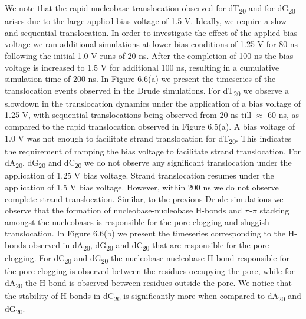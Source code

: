 We note that the rapid nucleobase translocation observed for dT\textsubscript{20} and for dG\textsubscript{20} arises due to the large applied bias voltage of 1.5 V. Ideally, we require a slow and sequential translocation. In order to investigate the effect of the applied bias-voltage we ran additional simulations at lower bias conditions of 1.25 V for 80 ns following the initial 1.0 V runs of 20 ns. After the completion of 100 ns the bias voltage is increased to 1.5 V for additional 100 ns, resulting in a cumulative simulation time of 200 ns. In Figure 6.6(a) we present the timeseries of the translocation events observed in the Drude simulations. For dT\textsubscript{20} we observe a slowdown in the translocation dynamics under the application of a bias voltage of 1.25 V, with sequential translocations being observed from 20 ns till $\approx$ 60 ns, as compared to the rapid translocation observed in Figure 6.5(a). A bias voltage of 1.0 V was not enough to facilitate strand translocation for dT\textsubscript{20}. This indicates the requirement of ramping the bias voltage to facilitate strand translocation. For dA\textsubscript{20}, dG\textsubscript{20} and dC\textsubscript{20} we do not observe any significant translocation under the application of 1.25 V bias voltage. Strand translocation resumes under the application of 1.5 V bias voltage. However, within 200 ns we do not observe complete strand translocation. Similar, to the previous Drude simulations we observe that the formation of nucleobase-nucleobase H-bonds and $\pi$-$\pi$ stacking amongst the nucleobases is responsible for the pore clogging and sluggish translocation. In Figure 6.6(b) we present the timeseries corresponding to the H-bonds observed in dA\textsubscript{20}, dG\textsubscript{20} and dC\textsubscript{20} that are responsible for the pore clogging. For dC\textsubscript{20} and dG\textsubscript{20} the nucleobase-nucleobase H-bond responsible for the pore clogging is observed between the residues occupying the pore, while for dA\textsubscript{20} the H-bond is observed between residues outside the pore. We notice that the stability of H-bonds in dC\textsubscript{20} is significantly more when compared to dA\textsubscript{20} and dG\textsubscript{20}.

